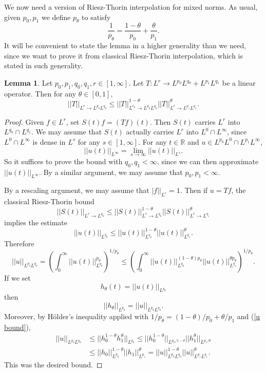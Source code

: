 \documentclass[10pt]{article}
\newcommand{\RR}{\mathbb{R}}
\theoremstyle{definition}
\newtheorem{lemma}{Lemma}[exer]
\begin{document}
We now need a version of Riesz-Thorin interpolation for mixed norms.
As usual, given $p_0, p_1$ we define $p_\theta$ to satisfy
$$\frac{1}{p_\theta} = \frac{1 - \theta}{p_0} + \frac{\theta}{p_1}.$$
It will be convenient to state the lemma in a higher generality than we need, since we want to prove it from classical Riesz-Thorin interpolation, which is stated in such generality.
\begin{lemma}
Let $p_0, p_1, q_0, q_1, r \in [1, \infty]$. Let $T: L^r \to L^{p_0}L^{q_0} + L^{p_1}L^{q_1}$ be a linear operator.
Then for any $\theta \in [0, 1]$,
$$||T||_{L^r \to L^{p_\theta}L^{q_\theta}} \leq ||T||_{L^{r_0} \to L^{p_0}L^{q_0}}^{1 - \theta} ||T||_{L^r \to L^{p_1}L^{q_1}}^\theta.$$
\end{lemma}
\begin{proof}
Given $f \in L^r$, set $S(t)f = (Tf)(t)$. Then $S(t)$ carries $L^r$ into $L^{q_0} \cap L^{q_1}$.
We may assume that $S(t)$ actually carries $L^r$ into $L^0 \cap L^\infty$, since $L^0 \cap L^\infty$ is dense in $L^s$ for any $s \in [1, \infty]$.
For any $t \in \RR$ and $u \in L^{p_0}L^0 \cap L^{p_1}L^\infty$,
$$||u(t)||_{L^\infty} = \lim_{s \to \infty} ||u(t)||_{L^s}.$$
So it suffices to prove the bound with $q_0,q_1 < \infty$, since we can then approximate $||u(t)||_{L^\infty}$.
By a similar argument, we may assume that $p_0,p_1 < \infty$.

By a rescaling argument, we may assume that $|f||_{L^r} = 1$. Then if $u = Tf$, the classical Riesz-Thorin bound
$$||S(t)||_{L^r \to L^{q_\theta}} \leq ||S(t)||_{L^r \to L^{q_0}}^{1 - \theta} ||S(t)||_{L^r \to L^{q_1}}^\theta$$
implies the estimate
$$
||u(t)||_{L^{q_\theta}} \leq ||u(t)||_{L^{q_0}}^{1 - \theta} ||u(t)||_{L^{q_1}}^\theta.
$$
Therefore
\begin{equation}
\label{u bound}
||u||_{L^{p_\theta}L^{q_\theta}} = \left(\int_0^\infty ||u(t)||_{L^{q_\theta}}^{p_\theta}\right)^{1/p_\theta} \leq \left(\int_0^\infty ||u(t)||_{L^{q_0}}^{(1-\theta)p_\theta} ||u(t)||_{L^{q_1}}^{\theta p_\theta}\right)^{1/p_\theta}.
\end{equation}
If we set
$$h_\theta(t) = ||u(t)||_{L^{q_\theta}}$$
then
$$||h_\theta||_{L^{p_\theta}} = ||u||_{L^{p_\theta}L^{q_\theta}}.$$
Moreover, by H\"older's inequality applied with $1/p_\theta = (1-\theta)/p_0 + \theta/p_1$ and (\ref{u bound}),
\begin{align*}
||u||_{L^{p_\theta}L^{q_\theta}} &\leq ||h_0^{1-\theta} h_1^\theta||_{L^{p_\theta}} \leq ||h_0^{1-\theta}||_{L^{p_0/1-\theta}} ||h_1^\theta||_{L^{p_1/\theta}}\\
&\leq ||h_0||_{L^{p_0}}^{1 - \theta} ||h_1||_{L^{p_1}}^\theta = ||u||_{L^{p_0}L^{q_0}}^{1 - \theta} ||u||_{L^{p_1}L^{q_1}}^\theta.
\end{align*}
This was the desired bound.
\end{proof}
\end{document}
